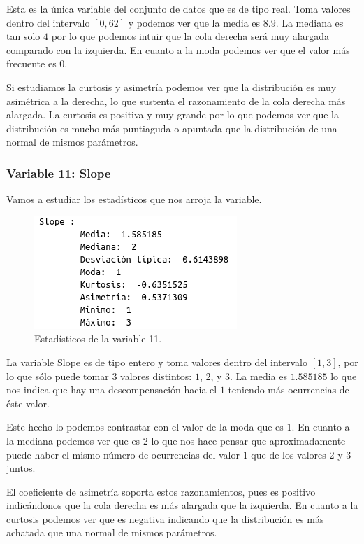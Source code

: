 \documentclass[12pt,a4paper]{article}
\begin{document}
Esta es la única variable del conjunto de datos que es de tipo real. Toma valores dentro del intervalo $[0,62]$ y podemos ver que la media es $8.9$. La mediana es tan solo $4$ por lo que podemos intuir que la cola derecha será muy alargada comparado con la izquierda. En cuanto a la moda podemos ver que el valor más frecuente es $0$.

Si estudiamos la curtosis y asimetría podemos ver que la distribución es muy asimétrica a la derecha, lo que sustenta el razonamiento de la cola derecha más alargada. La curtosis es positiva y muy grande por lo que podemos ver que la distribución es mucho más puntiaguda o apuntada que la distribución de una normal de mismos parámetros.

\subsubsection*{Variable 11: Slope}

Vamos a estudiar los estadísticos que nos arroja la variable.

\begin{figure}[H]
	\centering
	\includegraphics[scale=0.7]{./Imagenes/EDA/Clasificacion/estadisticos_variable11.png}
	\caption{Estadísticos de la variable 11.}
\end{figure}

La variable Slope es de tipo entero y toma valores dentro del intervalo $[1,3]$, por lo que sólo puede tomar $3$ valores distintos: $1$, $2$, y $3$. La media es $1.585185$ lo que nos indica que hay una descompensación hacia el $1$ teniendo más ocurrencias de éste valor.

Este hecho lo podemos contrastar con el valor de la moda que es $1$. En cuanto a la mediana podemos ver que es $2$ lo que nos hace pensar que aproximadamente puede haber el mismo número de ocurrencias del valor $1$ que de los valores $2$ y $3$ juntos.

El coeficiente de asimetría soporta estos razonamientos, pues es positivo indicándonos que la cola derecha es más alargada que la izquierda. En cuanto a la curtosis podemos ver que es negativa indicando que la distribución es más achatada que una normal de mismos parámetros.
\end{document}
